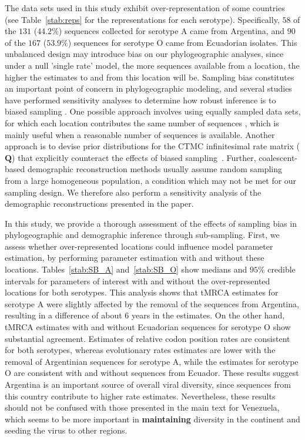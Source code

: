 \documentclass[a4paper,10pt]{article}
\begin{document}
The data sets used in this study exhibit over-representation of some countries (see Table~\ref{stab:reps} for the representations for each serotype).
Specifically, $58$ of the $131$ ($44.2\%$) sequences collected for serotype A came from Argentina, and $90$ of the $167$ ($53.9\%$) sequences for serotype O came from Ecuadorian isolates.
This unbalanced design may introduce bias on our phylogeographic analyses, since under a null 'single rate' model, the more sequences available from a location, the higher the estimates to and from this location will be.
Sampling bias constitutes an important point of concern in phylogeographic modeling, and several studies have performed sensitivity analyses to determine how robust inference is to biased sampling \cite{M-Faria2012, M-Lemey2014, M-Bedford2010, M-polar, M-fluPNAS}.
One possible approach involves using equally sampled data sets, for which each location contributes the same number of sequences \cite{M-fluPNAS}, which is mainly useful when a reasonable number of sequences is available.
Another approach is to devise prior distributions for the CTMC infinitesimal rate matrix ($\mathbf{Q}$) that explicitly counteract the effects of biased sampling~\cite{M-Faria2012}.
Further, coalescent-based demographic reconstruction methods usually assume random sampling from a large homogeneous population, a condition which may not be met for our sampling design.
We therefore also perform a sensitivity analysis of the demographic reconstructions presented in the paper.

In this study, we provide a thorough assessment of the effects of sampling bias in phylogeographic and demographic inference through sub-sampling. 
First, we assess whether over-represented locations could influence model parameter estimation, by performing parameter estimation with and without these locations.
Tables~\ref{stab:SB_A} and~\ref{stab:SB_O} show medians and $95 \%$ credible intervals for parameters of interest with and without the over-represented locations for both serotypes.
This analysis shows that tMRCA estimates for serotype A were slightly affected by the removal of the sequences from Argentina, resulting in a difference of about 6 years in the estimates.
On the other hand, tMRCA estimates with and without Ecuadorian sequences for serotype O show substantial agreement.
Estimates of relative codon position rates are consistent for both serotypes, whereas evolutionary rates estimates are lower with the removal of Argentinian sequences for serotype A, while the estimates for serotype O are consistent with and without sequences from Ecuador. 
These results suggest Argentina is an important source of overall viral diversity, since sequences from this country contribute to higher rate estimates.
Nevertheless, these results should not be confused with those presented in the main text for Venezuela, which seems to be more important in \textbf{maintaining} diversity in the continent and seeding the virus to other regions.
\end{document}
